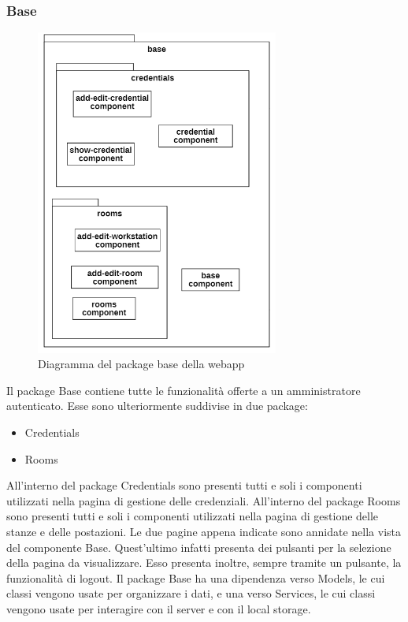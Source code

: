 \subsubsection{Base}
\begin{figure}[H]
	\centering
	\includegraphics[width=8cm]{res/images/webapp-base-diagrammaPackage.png}
	\caption{Diagramma del package base della webapp}
	\label{fig:DiagrammaPackageBaseWebapp}
\end{figure}
Il package Base contiene tutte le funzionalità offerte a un amministratore autenticato.
Esse sono ulteriormente suddivise in due package:
\begin{itemize}
	\item Credentials
	\item Rooms
\end{itemize}
All'interno del package Credentials sono presenti tutti e soli i componenti utilizzati nella pagina di gestione delle credenziali. All'interno del package Rooms sono presenti tutti e soli i componenti utilizzati nella pagina di gestione delle stanze e delle postazioni. Le due pagine appena indicate sono annidate nella vista del componente Base. Quest'ultimo infatti presenta dei pulsanti per la selezione della pagina da visualizzare. Esso presenta inoltre, sempre tramite un pulsante, la funzionalità di logout. \newline
Il package Base ha una dipendenza verso Models, le cui classi vengono usate per organizzare i dati, e una verso Services, le cui classi vengono usate per interagire con il server e con il local storage.

